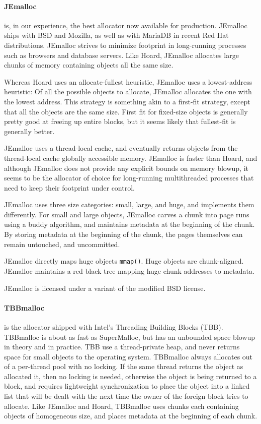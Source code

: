 \documentclass[pldi]{sigplanconf-pldi15}
\newcommand{\code}[1]{\texttt{#1}}
\begin{document}
{\paragraph{JEmalloc}} \cite{Evans06} is, in our experience, the best
allocator now available for production.  JEmalloc ships with BSD and
Mozilla, as well as with MariaDB in recent Red Hat distributions.
JEmalloc strives to minimize footprint in long-running processes such
as browsers and database servers.  Like Hoard, JEmalloc allocates
large chunks of memory containing objects all the same size.  

Whereas Hoard uses an allocate-fullest heuristic, JEmalloc uses a
lowest-address heuristic: Of all the possible objects to allocate,
JEmalloc allocates the one with the lowest address.  This strategy is
something akin to a first-fit strategy, except that all the objects
are the same size.  First fit for fixed-size objects is generally
pretty good at freeing up entire blocks, but it seems likely that
fullest-fit is generally better.

JEmalloc uses a thread-local cache, and eventually returns objects
from the thread-local cache globally accessible memory.  JEmalloc is
faster than Hoard, and although JEmalloc does not provide any explicit
bounds on memory blowup, it seems to be the allocator of choice for
long-running multithreaded processes that need to keep their footprint
under control.

JEmalloc uses three size categories: small, large, and huge, and
implements them differently. For small and large objects, JEmalloc
carves a chunk into page runs using a buddy algorithm, and maintains
metadata at the beginning of the chunk.  By storing metadata at the
beginning of the chunk, the pages themselves can remain untouched, and
uncommitted.

JEmalloc directly maps huge objects \code{mmap()}.  Huge objects are
chunk-aligned.  JEmalloc maintains a red-black tree mapping huge chunk
addresses to metadata.

JEmalloc is licensed under a variant of the modified BSD license.

{\paragraph{TBBmalloc}} \cite{KukanovVo07} is the allocator shipped
with Intel's Threading Building Blocks (TBB)\@.  TBBmalloc is about as
fast as SuperMalloc, but has an unbounded space blowup in theory and
in practice.  TBB use a thread-private heap, and never returns space
for small objects to the operating system.  TBBmalloc always allocates
out of a per-thread pool with no locking.  If the same thread returns
the object as allocated it, then no locking is needed, otherwise the
object is being returned to a  block, and requires
lightweight synchronization to place the object into a linked list
that will be dealt with the next time the owner of the foreign block
tries to allocate.  Like JEmalloc and Hoard, TBBmalloc uses chunks
each containing objects of homogeneous size, and places metadata at
the beginning of each chunk.
\end{document}
